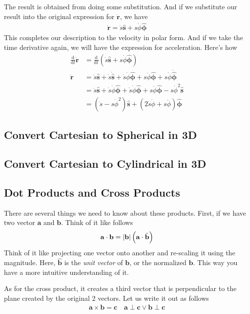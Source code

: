\documentclass[12pt]{article}
\newcommand{\dydx}[2]{\frac{\text{d} #1}{\text{d} #2}}
\newcommand{\paren}[1]{\left( #1 \right)}
\newcommand{\abso}[1]{\left|#1 \right|}
\newcommand{\uns}{\hat{\mathbf{s}}}
\newcommand{\unphi}{\hat{\boldsymbol\phi}}
\begin{document}
The result is obtained from doing some substitution. And if we substitute our result into the original expression for $\Dot{\mathbf{r}}$, we have
\begin{align}
\Dot{\mathbf{r}} = \Dot{s}\uns + s\Dot{\phi}\unphi
\end{align}
This completes our description to the velocity in polar form. And if we take the time derivative again, we will have the expression for acceleration. Here's how
\begin{align*}
    \dydx{}{t}\Dot{\mathbf{r}} &= \dydx{}{t}\paren{\Dot{s}\uns + s\Dot{\phi}\unphi} \\
    \ddot{\mathbf{r}} &= \ddot{s}\uns + \dot{s}\dot{\uns} + \dot{s}\Dot{\phi}\unphi + s\ddot{\phi}\unphi + s\Dot{\phi}\dot{\unphi}\\
                      &= \ddot{s}\uns + \dot{s}\dot{\phi}\unphi + \dot{s}\dot{\phi}\unphi + s\ddot{\phi}\unphi -  s\Dot{\phi}^2\uns\\
                      &= \paren{\ddot{s}-s\dot{\phi}^2}\uns + \paren{2\dot{s}\dot{\phi}+s\ddot{\phi}}\unphi
\end{align*}



\subsection{Convert Cartesian to Spherical in 3D}

\subsection{Convert Cartesian to Cylindrical in 3D}


\subsection{Dot Products and Cross Products}
There are several things we need to know about these products. First, if we have two vector $\mathbf{a}$ and $\mathbf{b}$. Think of it like follows
\begin{align}
\mathbf{a}\cdot\mathbf{b} = \abso{\mathbf{b}}\paren{\mathbf{a}\cdot \Hat{\mathbf{b}}}
\end{align}
Think of it like projecting one vector onto another and re-scaling it using the magnitude. Here, $\hat{\mathbf{b}}$ is the \textit{unit vector} of $\mathbf{b}$, or the normalized $\mathbf{b}$. This way you have a more intuitive understanding of it.

As for the cross product, it creates a third vector that is perpendicular to the plane created by the original 2 vectors. Let us write it out as follows
\begin{align}
\mathbf{a}\times \mathbf{b} = \mathbf{c} \quad \mathbf{a}\perp \mathbf{c} \vee \mathbf{b}\perp\mathbf{c}
\end{align}
\end{document}
